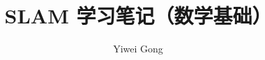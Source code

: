 \documentclass{article}
\begin{document}
\begin{CJK*}{UTF8}{gbsn}

\title{SLAM 学习笔记（数学基础）}
\author{Yiwei Gong}
\maketitle

\newpage



\end{CJK*}
\end{document}
